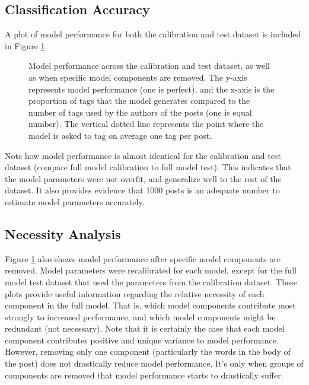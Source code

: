 \documentclass[10pt,letterpaper]{article}
\begin{document}
\subsection{Classification Accuracy}

A plot of model performance for both the calibration and test dataset is included in Figure \ref{fig:ROC}.

\begin{figure}[ht]
  \centering
  \caption{
    Model performance across the calibration and test dataset, as well as when specific model components are removed.
    The y-axis represents model performance (one is perfect), and the x-axis is the proportion of tags that the model generates compared to the number of tags used by the authors of the posts (one is equal number).
    The vertical dotted line represents the point where the model is asked to tag on average one tag per post.
  }
  \label{fig:ROC}
\end{figure}

Note how model performance is almost identical for the calibration and test dataset (compare full model calibration to full model test).
This indicates that the model parameters were not overfit, and generalize well to the rest of the dataset.
It also provides evidence that \num{1000} posts is an adequate number to estimate model parameters accurately.

\subsection{Necessity Analysis}

Figure \ref{fig:ROC} also shows model performance after specific model components are removed.
Model parameters were recalibrated for each model, except for the full model test dataset that used the parameters from the calibration dataset.
These plots provide useful information regarding the relative necessity of each component in the full model.
That is, which model components contribute most strongly to increased performance, and which model components might be redundant (not necessary).
Note that it is certainly the case that each model component contributes positive and unique variance to model performance.
However, removing only one component (particularly the words in the body of the post) does not drastically reduce model performance.
It's only when groups of components are removed that model performance starts to drastically suffer.
\end{document}
